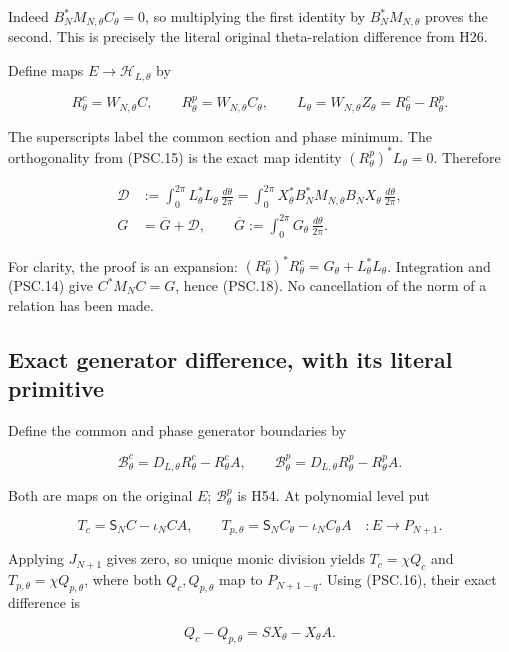 Indeed \(B_N^*M_{N,\theta}C_\theta=0\), so multiplying the first identity by \(B_N^*M_{N,\theta}\) proves the second. This is precisely the literal original theta-relation difference from H26.

Define maps \(E\to\mathcal H_{L,\theta}\) by

\[
 R^c_\theta=W_{N,\theta}C,\qquad
 R^p_\theta=W_{N,\theta}C_\theta,\qquad
 L_\theta=W_{N,\theta}Z_\theta
 =R^c_\theta-R^p_\theta .
 \tag{PSC.17}
\]

The superscripts label the common section and phase minimum. The orthogonality from (PSC.15) is the exact map identity
\((R^p_\theta)^*L_\theta=0\). Therefore

\[
 \begin{aligned}
 \mathscr D
 &:=\int_0^{2\pi}L_\theta^*L_\theta\,\frac{d\theta}{2\pi}
   =\int_0^{2\pi}X_\theta^*B_N^*M_{N,\theta}B_NX_\theta
       \,\frac{d\theta}{2\pi},\\
 G&=\overline G+\mathscr D,\qquad
 \overline G:=\int_0^{2\pi}G_\theta\,\frac{d\theta}{2\pi}.
 \end{aligned}
 \tag{PSC.18}
\]

For clarity, the proof is an expansion:
\((R^c_\theta)^*R^c_\theta
=G_\theta+L_\theta^*L_\theta\).
Integration and (PSC.14) give \(C^*M_NC=G\), hence (PSC.18). No cancellation of the norm of a relation has been made.

\subsection{Exact generator difference, with its literal primitive}

Define the common and phase generator boundaries by

\[
 \mathscr B^c_\theta
 =D_{L,\theta}R^c_\theta-R^c_\theta A,\qquad
 \mathscr B^p_\theta
 =D_{L,\theta}R^p_\theta-R^p_\theta A.
 \tag{PSC.19}
\]

Both are maps on the original \(E\); \(\mathscr B^p_\theta\) is H54. At polynomial level put

\[
 T_c=\mathsf S_NC-\iota_NCA,\qquad
 T_{p,\theta}=\mathsf S_NC_\theta-\iota_NC_\theta A
 \quad:E\longrightarrow P_{N+1}.
\]

Applying \(J_{N+1}\) gives zero, so unique monic division yields
\(T_c=\chi Q_c\) and \(T_{p,\theta}=\chi Q_{p,\theta}\), where both
\(Q_c,Q_{p,\theta}\) map to \(P_{N+1-q}\). Using (PSC.16), their exact difference is

\[
 Q_c-Q_{p,\theta}=SX_\theta-X_\theta A.
 \tag{PSC.20}
\]

